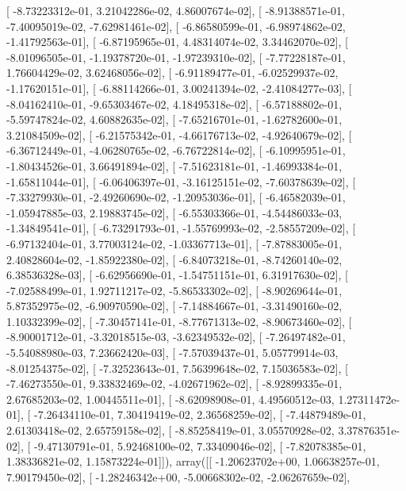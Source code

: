 \documentclass{article}
\begin{document}
       [ -8.73223312e-01,   3.21042286e-02,   4.86007674e-02],
       [ -8.91388571e-01,  -7.40095019e-02,  -7.62981461e-02],
       [ -6.86580599e-01,  -6.98974862e-02,  -1.41792563e-01],
       [ -6.87195965e-01,   4.48314074e-02,   3.34462070e-02],
       [ -8.01096505e-01,  -1.19378720e-01,  -1.97239310e-02],
       [ -7.77228187e-01,   1.76604429e-02,   3.62468056e-02],
       [ -6.91189477e-01,  -6.02529937e-02,  -1.17620151e-01],
       [ -6.88114266e-01,   3.00241394e-02,  -2.41084277e-03],
       [ -8.04162410e-01,  -9.65303467e-02,   4.18495318e-02],
       [ -6.57188802e-01,  -5.59747824e-02,   4.60882635e-02],
       [ -7.65216701e-01,  -1.62782600e-01,   3.21084509e-02],
       [ -6.21575342e-01,  -4.66176713e-02,  -4.92640679e-02],
       [ -6.36712449e-01,  -4.06280765e-02,  -6.76722814e-02],
       [ -6.10995951e-01,  -1.80434526e-01,   3.66491894e-02],
       [ -7.51623181e-01,  -1.46993384e-01,  -1.65811044e-01],
       [ -6.06406397e-01,  -3.16125151e-02,  -7.60378639e-02],
       [ -7.33279930e-01,  -2.49260690e-02,  -1.20953036e-01],
       [ -6.46582039e-01,  -1.05947885e-03,   2.19883745e-02],
       [ -6.55303366e-01,  -4.54486033e-03,  -1.34849541e-01],
       [ -6.73291793e-01,  -1.55769993e-02,  -2.58557209e-02],
       [ -6.97132404e-01,   3.77003124e-02,  -1.03367713e-01],
       [ -7.87883005e-01,   2.40828604e-02,  -1.85922380e-02],
       [ -6.84073218e-01,  -8.74260140e-02,   6.38536328e-03],
       [ -6.62956690e-01,  -1.54751151e-01,   6.31917630e-02],
       [ -7.02588499e-01,   1.92711217e-02,  -5.86533302e-02],
       [ -8.90269644e-01,   5.87352975e-02,  -6.90970590e-02],
       [ -7.14884667e-01,  -3.31490160e-02,   1.10332399e-02],
       [ -7.30457141e-01,  -8.77671313e-02,  -8.90673460e-02],
       [ -8.90001712e-01,  -3.32018515e-03,  -3.62349532e-02],
       [ -7.26497482e-01,  -5.54088980e-03,   7.23662420e-03],
       [ -7.57039437e-01,   5.05779914e-03,  -8.01254375e-02],
       [ -7.32523643e-01,   7.56399648e-02,   7.15036583e-02],
       [ -7.46273550e-01,   9.33832469e-02,  -4.02671962e-02],
       [ -8.92899335e-01,   2.67685203e-02,   1.00445511e-01],
       [ -8.62098908e-01,   4.49560512e-03,   1.27311472e-01],
       [ -7.26434110e-01,   7.30419419e-02,   2.36568259e-02],
       [ -7.44879489e-01,   2.61303418e-02,   2.65759158e-02],
       [ -8.85258419e-01,   3.05570928e-02,   3.37876351e-02],
       [ -9.47130791e-01,   5.92468100e-02,   7.33409046e-02],
       [ -7.82078385e-01,   1.38336821e-02,   1.15873224e-01]]), array([[ -1.20623702e+00,   1.06638257e-01,   7.90179450e-02],
       [ -1.28246342e+00,  -5.00668302e-02,  -2.06267659e-02],
\end{document}
